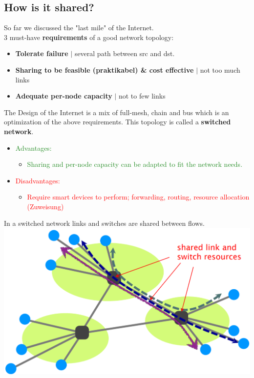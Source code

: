 \documentclass[a4paper, fontsize=8pt, landscape, DIV=1]{scrartcl}
\begin{document}
\begin{multicols*}{4}
			\subsection{How is it shared?}
			\vspace{0.1cm}
				So far we discussed the "last mile" of the Internet.\\
				3 must-have \textbf{requirements} of a good network topology: 
				\begin{itemize}
					\item \textbf{Tolerate failure} $\vert$ several path between src and dst.
					\item \textbf{Sharing to be feasible (praktikabel) \& cost effective } $\vert$ not too much links 
					\item \textbf{Adequate per-node capacity} $\vert$ not to few links 
				\end{itemize}
				The Design of the Internet is a mix of full-mesh, chain and bus which is an optimization of the above requirements. This topology is called a \textbf{switched network}.
				\vspace{-0.5cm}
				\begin{itemize}[noitemsep,topsep=0pt]
					\item \textcolor{ForestGreen}{Advantages:}
					\begin{itemize}
						\item \textcolor{ForestGreen}{Sharing and per-node capacity can be adapted to fit the network needs.}
					\end{itemize} 
					\item \textcolor{Red}{Disadvantages:}
					\begin{itemize}
						\item \textcolor{Red}{Require smart devices to perform; forwarding, routing, resource allocation (Zuweisung) }
					\end{itemize} 
				\end{itemize} 
				In a switched network links and switches are shared between flows.
				\includegraphics[width= \columnwidth]{images/Overview/link_switch_sharing.png}
				\columnbreak
				

\end{multicols*}
\end{document}
